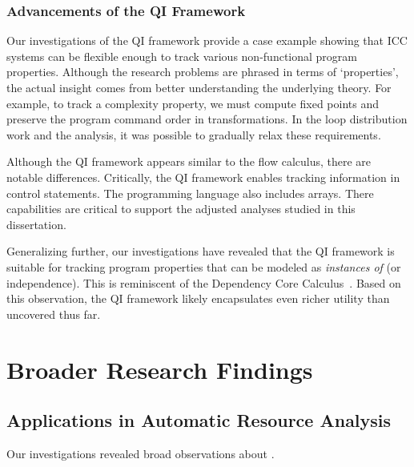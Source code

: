 \subsubsection{Advancements of the QI Framework}
\label{subsubsec:qi-res}

Our investigations of the QI framework provide a case example showing that ICC
systems can be flexible enough to track various non-functional program
properties. Although the research problems are
phrased in terms of `properties', the actual insight comes from better
understanding the underlying theory. For example, to track a complexity
property, we must compute fixed points and preserve the program command order in
transformations. In the loop distribution work and the 
analysis, it was possible to gradually relax these requirements.

Although the QI framework appears similar to the flow calculus, there are
notable differences. Critically, the QI framework enables tracking information
in control statements. The programming language also includes arrays. There
capabilities are critical to support the adjusted analyses studied in this
dissertation.

Generalizing further, our investigations have revealed that the  QI framework is
suitable for tracking program properties that can be modeled as \emph{instances
of } (or independence). This is reminiscent of the
Dependency Core Calculus~\cite{abadi1999b}. Based on this observation, the QI
framework likely encapsulates even richer utility than uncovered thus far.

\section{Broader Research Findings}
\label{sec:broader-findings}

\subsection{Applications in Automatic Resource Analysis}
\label{subsec:res-resource-analysis}

Our investigations revealed broad observations about .

